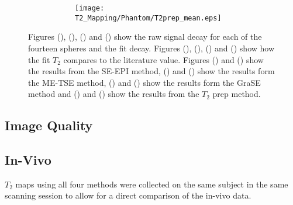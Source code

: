 \begin{figure}[H]
\begin{subfigure}[c]{0.9\textwidth}
		\hfill
		\begin{subfigure}[c]{0.47\textwidth}
			\centering
			\texttt{[image: T2\_Mapping/Phantom/T2prep\_mean.eps]}
			\caption{}
			\label{fig:t2_phantom_t2prep_mean}
		\end{subfigure}
	\end{subfigure}
	\caption{Figures (), (), () and () show the raw signal decay for each of the fourteen spheres and the fit decay. Figures (), (), () and () show how the fit $T_2$ compares to the literature value. Figures () and () show the results from the \ac{SE}-\ac{EPI} method, () and () show the results form the \ac{ME-TSE} method, () and () show the results form the \ac{GraSE} method and () and () show the results from the $T_2$ prep method.} 
	\label{fig:t2_phantom}
\end{figure}

\subsection{Image Quality}

\subsection{In-Vivo}

$T_2$ maps using all four methods were collected on the same subject in the same scanning session to allow for a direct comparison of the in-vivo data. 

